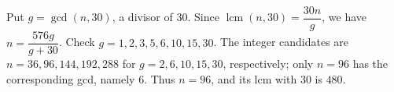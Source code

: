 Put $g=\gcd(n,30)$, a divisor of $30$. Since $\operatorname{lcm}(n,30)=\dfrac{30n}{g}$, we have $n=\dfrac{576g}{g+30}$. Check $g=1,2,3,5,6,10,15,30$. The integer candidates are $n=36,96,144,192,288$ for $g=2,6,10,15,30$, respectively; only $n=96$ has the corresponding gcd, namely $6$. Thus $\boxed{n=96}$, and its lcm with $30$ is $480$.
